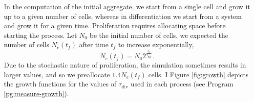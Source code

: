 In the computation of the initial aggregate, we start from a single cell and grow it up to a given number of cells, whereas in differentiation we start from a system and grow it for a given time. Proliferation requires allocating space before starting the process. Let $N_0$ be the initial number of cells, we expected the number of cells $N_e(t_f)$ after time $t_f$ to increase exponentially,
\begin{equation}\label{eq:growth}
    N_e(t_f) = N_0  2 ^ {\frac{t_f}{\tau_\text{div}}}.
\end{equation}
Due to the stochastic nature of proliferation, the simulation sometimes results in larger values, and so we preallocate $1.4N_e(t_f)$ cells. I Figure \ref{fig:growth} depicts the growth functions for the values of $\tau_\text{div}$ used in each process (see Program \ref{pg:measure-growth}).


